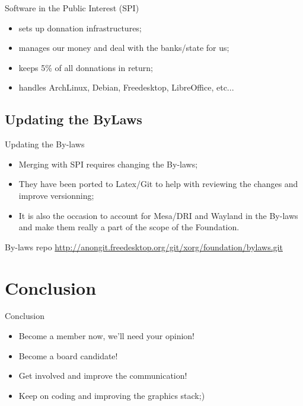 \documentclass{beamer}
\begin{document}
		\begin{frame}
			\begin{block}{Software in the Public Interest (SPI)}
				\begin{itemize}
					\item sets up donnation infrastructures;
					\item manages our money and deal with the banks/state for us;
					\item keeps 5\% of all donnations in return;
					\item handles ArchLinux, Debian, Freedesktop, LibreOffice, etc...
				\end{itemize}
			\end{block}
		\end{frame}

		\subsection{Updating the ByLaws}
		\begin{frame}
			\begin{block}{Updating the By-laws}
				\begin{itemize}
					\item Merging with SPI requires changing the By-laws;
					\item They have been ported to Latex/Git to help with
reviewing the changes and improve versionning;
					\item It is also the occasion to account for 
Mesa/DRI and Wayland in the By-laws and make them really a part of the scope of the Foundation.
				\end{itemize}
			\end{block}

			\begin{block}{By-laws repo}
				\url{http://anongit.freedesktop.org/git/xorg/foundation/bylaws.git}
			\end{block}
		\end{frame}

	\section{Conclusion}
		\begin{frame}
			\begin{block}{Conclusion}
				\begin{itemize}
					\item Become a member now, we'll need your opinion!
					\item Become a board candidate!
					\item Get involved and improve the communication!
					\item Keep on coding and improving the graphics stack;)
				\end{itemize}
			\end{block}
		\end{frame}
\end{document}
